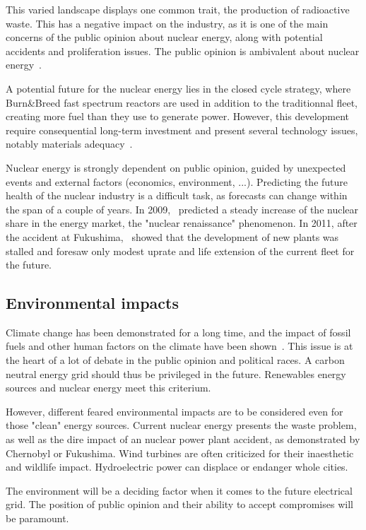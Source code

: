\documentclass[IJPHM, 2017, 29]{PHMSociety}
\begin{document}
This varied landscape displays one common trait, the production of radioactive waste. This has a negative impact on the industry, as it is one of the main concerns of the public opinion about nuclear energy, along with potential accidents and proliferation issues. The public opinion is ambivalent about nuclear energy~\citep{publicnuclear}.

A potential future for the nuclear energy lies in the closed cycle strategy, where Burn\&Breed fast spectrum reactors are used in addition to the traditionnal fleet, creating more fuel than they use to generate power. However, this development require consequential long-term investment and present several technology issues, notably materials adequacy~\citep{salvatores2005nuclear}.

Nuclear energy is strongly dependent on public opinion, guided by unexpected events and external factors (economics, environment, ...). Predicting the future health of the nuclear industry is a difficult task, as forecasts can change within the span of a couple of years. In 2009,~\cite{nuclearok} predicted a steady increase of the nuclear share in the energy market, the "nuclear renaissance" phenomenon. In 2011, after the accident at Fukushima,~\cite{nuclearnok} showed that the development of new plants was stalled and foresaw only modest uprate and life extension of the current fleet for the future.

\subsection{Environmental impacts}

Climate change has been demonstrated for a long time, and the impact of fossil fuels and other human factors on the climate have been shown~\citep{karl2003modern}. This issue is at the heart of a lot of debate in the public opinion and political races. A carbon neutral energy grid should thus be privileged in the future. Renewables energy sources and nuclear energy meet this criterium.

However, different feared environmental impacts are to be considered even for those "clean" energy sources. Current nuclear energy presents the waste problem, as well as the dire impact of an nuclear power plant accident, as demonstrated by Chernobyl or Fukushima. Wind turbines are often criticized for their inaesthetic and wildlife impact. Hydroelectric power can displace or endanger whole cities.

The environment will be a deciding factor when it comes to the future electrical grid. The position of public opinion and their ability to accept compromises will be paramount.
\end{document}
